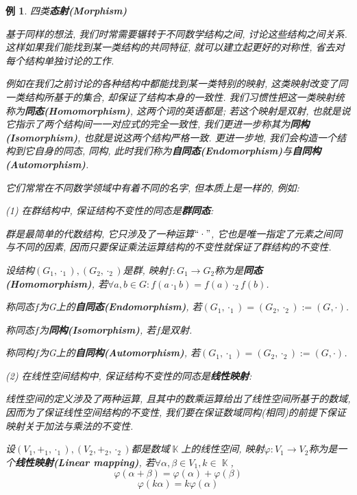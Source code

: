 \documentclass[UTF8]{ctexart}
\newcommand{\<}{\langle}
\renewcommand{\>}{\rangle}
\DeclareMathOperator{\K}{\mathbb{K}}
\newtheorem{xmp}{例}[subsection]
\begin{document}
            \begin{xmp}
                四类\textbf{态射(Morphism)}

                基于同样的想法, 我们时常需要辗转于不同数学结构之间, 讨论这些结构之间关系. 这样如果我们能找到某一类结构的共同特征, 就可以建立起更好的对称性, 省去对每个结构单独讨论的工作. 

                例如在我们之前讨论的各种结构中都能找到某一类特别的映射, 这类映射改变了同一类结构所基于的集合, 却保证了结构本身的一致性. 我们习惯性把这一类映射统称为\textbf{同态(Homomorphism)}, 这两个词的英语都是; 若这个映射是双射, 也就是说它指示了两个结构间一一对应式的完全一致性, 我们更进一步称其为\textbf{同构(Isomorphism)}, 也就是说这两个结构严格一致. 更进一步地, 我们会构造一个结构到它自身的同态, 同构, 此时我们称为\textbf{自同态(Endomorphism)}与\textbf{自同构(Automorphism)}. 
                
                它们常常在不同数学领域中有着不同的名字, 但本质上是一样的, 例如: 
                \newline
                
                (1) 在群结构中, 保证结构不变性的同态是\textbf{群同态}: 

                群是最简单的代数结构, 它只涉及了一种运算$``\cdot"$, 它也是唯一指定了元素之间同与不同的因素, 因而只要保证乘法运算结构的不变性就保证了群结构的不变性. 

                设结构$(G_1,\cdot_1),(G_2,\cdot_2)$是群, 映射$f:G_1\to G_2$称为是\textbf{同态(Homomorphism)}, 若$\forall a,b\in G: f(a\cdot_1 b)=f(a)\cdot_2 f(b)$. 
                
                称同态$f$为G上的\textbf{自同态(Endomorphism)}, 若$(G_1,\cdot_1)=(G_2,\cdot_2):=(G,\cdot)$. 
                
                称同态$f$为\textbf{同构(Isomorphism)}, 若$f$是双射. 
                
                称同构$f$为G上的\textbf{自同构(Automorphism)}, 若$(G_1,\cdot_1)=(G_2,\cdot_2):=(G,\cdot)$. 
                \newline

                (2) 在线性空间结构中, 保证结构不变性的同态是\textbf{线性映射}: 

                线性空间的定义涉及了两种运算, 且其中的数乘运算给出了线性空间所基于的数域, 因而为了保证线性空间结构的不变性, 我们要在保证数域同构(相同)的前提下保证映射关于加法与乘法的不变性. 
                
                设$(V_{1},+_1,\cdot_1),(V_{2},+_2,\cdot_2)$都是数域$\K$上的线性空间, 映射$\varphi: V_{1}\to V_{2}$称为是一个\textbf{线性映射(Linear mapping)}, 若$\forall \alpha, \beta\in V_{1}, k\in \K$, 
                \[\varphi (\alpha+\beta)=\varphi(\alpha)+\varphi(\beta)\]
                \[\varphi(k\alpha)=k\varphi(\alpha)\]
                

\end{xmp}
\end{document}
